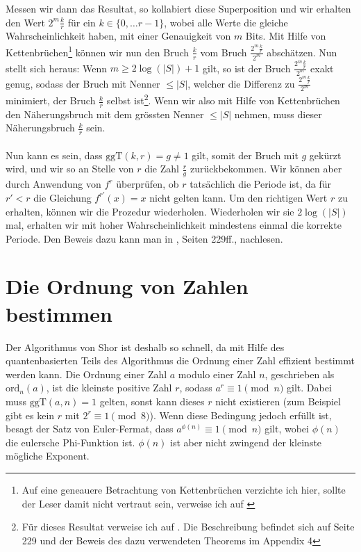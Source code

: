 Messen wir dann das Resultat, so kollabiert diese Superposition und wir erhalten den Wert $2^m\frac{k}{r}$ für ein $k \in \{0, \dots r - 1\}$, wobei alle Werte die gleiche Wahrscheinlichkeit haben, mit einer Genauigkeit von $m$ Bits. Mit Hilfe von Kettenbrüchen\footnote{Auf eine geneauere Betrachtung von Kettenbrüchen verzichte ich hier, sollte der Leser damit nicht vertraut sein, verweise ich auf \cite{Frac}} können wir nun den Bruch $\frac{k}{r}$ vom Bruch $\frac{2^m\frac{k}{r}}{2^m}$ abschätzen. Nun stellt sich heraus: Wenn $m \geq 2\log(|S|) + 1$ gilt, so ist der Bruch $\frac{2^m\frac{k}{r}}{2^m}$ exakt genug, sodass der Bruch mit Nenner $\leq |S|$, welcher die Differenz zu $\frac{2^m\frac{k}{r}}{2^m}$ minimiert, der Bruch $\frac{k}{r}$ selbst ist\footnote{Für dieses Resultat verweise ich auf \cite{QC}. Die Beschreibung befindet sich auf Seite 229 und der Beweis des dazu verwendeten Theorems im Appendix 4}. Wenn wir also mit Hilfe von Kettenbrüchen den Näherungsbruch mit dem grössten Nenner $\leq |S|$ nehmen, muss dieser Näherungsbruch $\frac{k}{r}$ sein.
\paragraph{}
Nun kann es sein, dass $\text{ggT}(k, r) = g \neq 1$ gilt, somit der Bruch mit $g$ gekürzt wird, und wir so an Stelle von $r$ die Zahl $\frac{r}{g}$ zurückbekommen. Wir können aber durch Anwendung von $f^r$ überprüfen, ob $r$ tatsächlich die Periode ist, da für $r' < r$ die Gleichung $f^{r'}(x) = x$ nicht gelten kann. Um den richtigen Wert $r$ zu erhalten, können wir die Prozedur wiederholen. Wiederholen wir sie $2\log(|S|)$ mal, erhalten wir mit hoher Wahrscheinlichkeit mindestens einmal die korrekte Periode. Den Beweis dazu kann man in \cite{QC}, Seiten 229ff., nachlesen.

\section{Die Ordnung von Zahlen bestimmen}
Der Algorithmus von Shor ist deshalb so schnell, da mit Hilfe des quantenbasierten Teils des Algorithmus die Ordnung einer Zahl effizient bestimmt werden kann. Die Ordnung einer Zahl $a$ modulo einer Zahl $n$, geschrieben als $\text{ord}_n(a)$, ist die kleinste positive Zahl $r$, sodass $a^r \equiv 1 \pmod{n}$ gilt. Dabei muss $\text{ggT}(a, n) = 1$ gelten, sonst kann dieses $r$ nicht existieren (zum Beispiel gibt es kein $r$ mit $2^r \equiv 1 \pmod{8}$). Wenn diese Bedingung jedoch erfüllt ist, besagt der Satz von Euler-Fermat, dass $a^{\phi(n)} \equiv 1 \pmod{n}$ gilt, wobei $\phi(n)$ die eulersche Phi-Funktion ist. $\phi(n)$ ist aber nicht zwingend der kleinste mögliche Exponent. 

